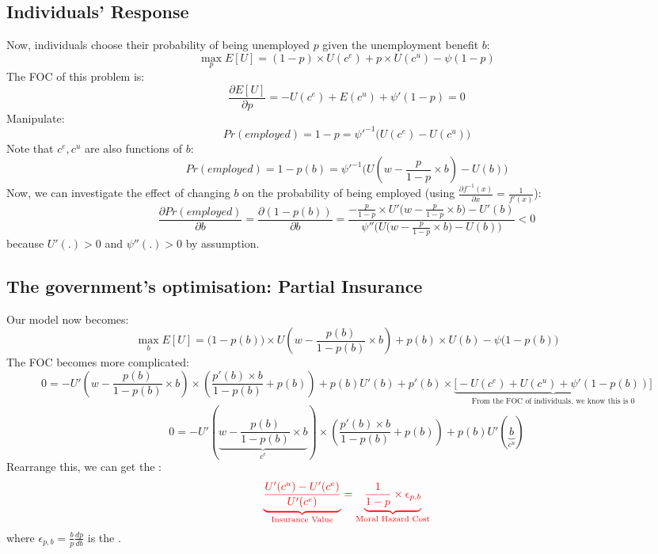     \subsection{Individuals' Response}
        Now, individuals choose their probability of being unemployed $p$ given the unemployment benefit $b$:
        $$\max_p E[U] = (1-p)\times{U(c^e)} + p\times{U(c^u)} - \psi(1-p)$$
        The FOC of this problem is:
        $$\frac{\partial E[U]}{\partial p}=-U(c^e)+E(c^u)+\psi'(1-p) = 0$$
        Manipulate:
        $$Pr(employed) = 1-p = \psi'^{-1}\Big(U(c^e)-U(c^u)\Big)$$
        Note that $c^e, c^u$ are also functions of $b$:
        \begin{equation}
            \label{eqn:ui_mh_optimal_p}
            Pr(employed) = 1-p(b) = \psi'^{-1}\Big(U(w-\frac{p}{1-p}\times{b})-U(b)\Big)
        \end{equation}
        Now, we can investigate the effect of changing $b$ on the probability of being employed (using $\frac{\partial f^{-1}(x)}{\partial x} = \frac{1}{f'(x)}$):
        $$\frac{\partial Pr(employed)}{\partial b}=\frac{\partial(1-p(b))}{\partial b} = \frac{-\frac{p}{1-p}\times{U'\big(w-\frac{p}{1-p}\times{b}\big)}-U'(b)}{\psi''\Big(U\big(w-\frac{p}{1-p}\times{b}\big)-U(b)\Big)} < 0$$
        because $U'(.)>0$ and $\psi''(.)>0$ by assumption.
        
    \subsection{The government's optimisation: Partial Insurance}
        Our model now becomes:
        $$\max_b E[U] = \big(1-p(b)\big)\times{U\left(w-\frac{p(b)}{1-p(b)}\times{b}\right)} + p(b)\times{U(b)} - \psi\big(1-p(b)\big)$$
        The FOC becomes more complicated:
        $$0 = -U'\left( w-\frac{p(b)}{1-p(b)}\times{b} \right)\times{\left(\frac{p'(b)\times{b}}{1-p(b)}+p(b)\right)} + p(b)U'(b) + p'(b)\times\underbrace{\big[-U(c^e)+U(c^u)+\psi'(1-p(b))\big]}_{\text{From\ the\ FOC\ of\ individuals,\ we\ know\ this\ is\ 0}}$$
        $$0 = -U'\left(\underbrace{ w-\frac{p(b)}{1-p(b)}\times{b} }_{c^e}\right)\times{\left(\frac{p'(b)\times{b}}{1-p(b)}+p(b)\right)} + p(b)U'(\underbrace{b}_{c^u})$$
        Rearrange this, we can get the :
        \begin{equation}
            \label{eqn:ui_mh_main}
            \color{red}
            \underbrace{\frac{U'(c^u)-U'(c^e)}{U'(c^e)}}_{\text{Insurance\ Value}} = \underbrace{\frac{1}{1-p}\times{\epsilon_{p,b}}}_{\text{Moral\ Hazard\ Cost}}
        \end{equation}
        where $\epsilon_{p,b} = \frac{b}{p}\frac{dp}{db}$ is the .
        
